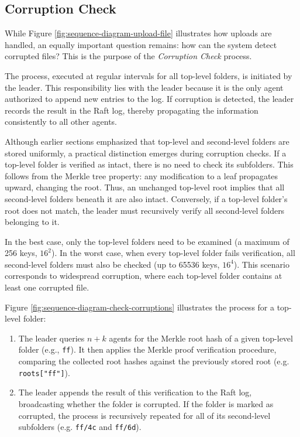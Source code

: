 \newpage
\subsection{Corruption Check} \label{sec:check-corruption}

While Figure \ref{fig:sequence-diagram-upload-file} illustrates how uploads are handled, an equally important question remains: how can the system detect corrupted files? This is the purpose of the \emph{Corruption Check} process.

The process, executed at regular intervals for all top-level folders, is initiated by the leader. This responsibility lies with the leader because it is the only agent authorized to append new entries to the log. If corruption is detected, the leader records the result in the Raft log, thereby propagating the information consistently to all other agents.

Although earlier sections emphasized that top-level and second-level folders are stored uniformly, a practical distinction emerges during corruption checks. If a top-level folder is verified as intact, there is no need to check its subfolders. This follows from the Merkle tree property: any modification to a leaf propagates upward, changing the root. Thus, an unchanged top-level root implies that all second-level folders beneath it are also intact. Conversely, if a top-level folder's root does not match, the leader must recursively verify all second-level folders belonging to it.

In the best case, only the top-level folders need to be examined (a maximum of 256 keys, $16^2$). In the worst case, when every top-level folder fails verification, all second-level folders must also be checked (up to 65536 keys, $16^4$). This scenario corresponds to widespread corruption, where each top-level folder contains at least one corrupted file.

Figure \ref{fig:sequence-diagram-check-corruptions} illustrates the process for a top-level folder:

\renewcommand{\labelenumi}{\textbf{(\theenumi)}}
\begin{enumerate}
    \item The leader queries $n+k$ agents for the Merkle root hash of a given top-level folder (e.g., \texttt{ff}). It then applies the Merkle proof verification procedure, comparing the collected root hashes against the previously stored root (e.g. \texttt{roots["ff"]}).
    \item The leader appends the result of this verification to the Raft log, broadcasting whether the folder is corrupted. If the folder is marked as corrupted, the process is recursively repeated for all of its second-level subfolders (e.g. \texttt{ff/4c} and \texttt{ff/6d}).
\end{enumerate}


